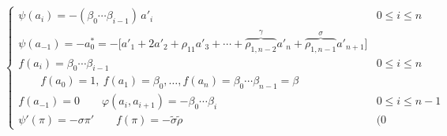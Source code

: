 \documentclass[11pt,a4paper]{article}
\begin{document}
\[
\begin{cases}
\psi(a_i) = -(\beta_0 \cdots \beta_{i-1})\, a'_i & 0 \leqslant i \leqslant n \\
\psi(a_{-1}) = -a^{*}_0 = -\bigl[a'_1 + 2a'_2 + \rho_{11} a'_3 + \cdots
+ \overbrace{\rho_{1,n-2}}^{\gamma} a'_n + \overbrace{\rho_{1,n-1}}^{\sigma} a'_{n+1}\bigr] \\
f(a_i) = \beta_0 \cdots \beta_{i-1} & 0 \leqslant i \leqslant n \\
\qquad f(a_0) = 1,\ f(a_1) = \beta_0, \ldots, f(a_n) = \beta_0 \cdots \beta_{n-1} = \beta \\
f(a_{-1}) = 0 \qquad \varphi(a_i, a_{i+1}) = -\beta_0 \cdots \beta_i & 0 \leqslant i \leqslant n-1 \\
\psi'(\pi) = -\sigma\pi' \qquad f(\pi) = -\tilde{\sigma}\tilde{\rho} & (0
\end{cases}
\]
\end{document}
